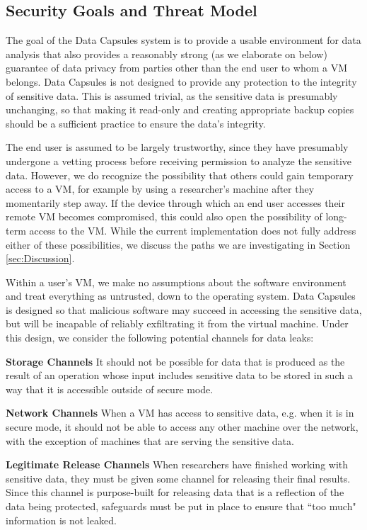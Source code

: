 \documentclass{acm_proc_article-sp}
\begin{document}
\subsection{Security Goals and Threat Model}
\label{sec:Threat Model}

The goal of the Data Capsules system is to provide a usable environment for data
analysis that also provides a reasonably strong (as we elaborate on below)
guarantee of data privacy from parties other than the end user to whom a VM
belongs.  Data Capsules is not designed to provide any protection to the
integrity of sensitive data.  This is assumed trivial, as the sensitive data is
presumably unchanging, so that making it read-only and creating appropriate
backup copies should be a sufficient practice to ensure the data's integrity.

The end user is assumed to be largely trustworthy, since they have presumably
undergone a vetting process before receiving permission to analyze the sensitive
data.  However, we do recognize the possibility that others could gain temporary
access to a VM, for example by using a researcher's machine after they
momentarily step away.  If the device through which an end user accesses their
remote VM becomes compromised, this could also open the possibility of long-term
access to the VM.  While the current implementation does not fully address
either of these possibilities, we discuss the paths we are investigating in
Section \ref{sec:Discussion}. 

Within a user's VM, we make no assumptions about the software environment and
treat everything as untrusted, down to the operating system.  Data Capsules is
designed so that malicious software may succeed in accessing the sensitive data,
but will be incapable of reliably exfiltrating it from the virtual machine.
Under this design, we consider the following potential channels for data leaks:

\textbf{Storage Channels} It should not be possible for data that is produced
as the result of an operation whose input includes sensitive data to be stored
in such a way that it is accessible outside of secure mode.

\textbf{Network Channels} When a VM has access to sensitive data, e.g. when it
is in secure mode, it should not be able to access any other machine over the
network, with the exception of machines that are serving the sensitive data.

\textbf{Legitimate Release Channels} When researchers have finished working with
sensitive data, they must be given some channel for releasing their final
results.  Since this channel is purpose-built for releasing data that is a
reflection of the data being protected, safeguards must be put in place to
ensure that ``too much" information is not leaked.
\end{document}
